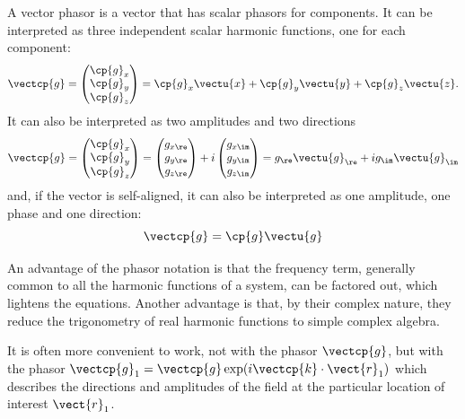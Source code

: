 A vector phasor is a vector that has scalar phasors for components.
It can be interpreted as three independent scalar harmonic functions, one for each component:
\begin{equation}
    \vectcp{g} =
    \begin{pmatrix}
        \cp{g}_x \\ \cp{g}_y \\ \cp{g}_z
    \end{pmatrix}
    =
    \cp{g}_x \vectu{x} + \cp{g}_y \vectu{y} + \cp{g}_z \vectu{z}
    \text{.}
\end{equation}
It can also be interpreted as two amplitudes and two directions
\begin{equation}
    \vectcp{g} =
    \begin{pmatrix}
        \cp{g}_x \\ \cp{g}_y \\ \cp{g}_z
    \end{pmatrix}
    =
    \begin{pmatrix}
        g_{x\re} \\ g_{y\re} \\ g_{z\re}
    \end{pmatrix}
    +
    i
    \begin{pmatrix}
        g_{x\im} \\ g_{y\im} \\ g_{z\im}
    \end{pmatrix}
    =
    g_\re \vectu{g}_\re
    +
    i
    g_\im \vectu{g}_\im
\end{equation}
and, if the vector is self-aligned, it can also be interpreted as one amplitude, one phase and one direction:
\begin{equation}
    \vectcp{g} = \cp{g} \vectu{g}
\end{equation}

An advantage of the phasor notation is that the frequency term, generally common to all the harmonic functions of a system, can be factored out, which lightens the equations.
Another advantage is that, by their complex nature, they reduce the trigonometry of real harmonic functions to simple complex algebra.

It is often more convenient to work, not with the phasor $\vectcp{g}$,
but with the phasor $\vectcp{g}_1 = \vectcp{g} \exp(i \vectcp{k} \cdot \vect{r}_1)$
which describes the directions and amplitudes of the field at the particular location of interest $\vect{r}_1$.

